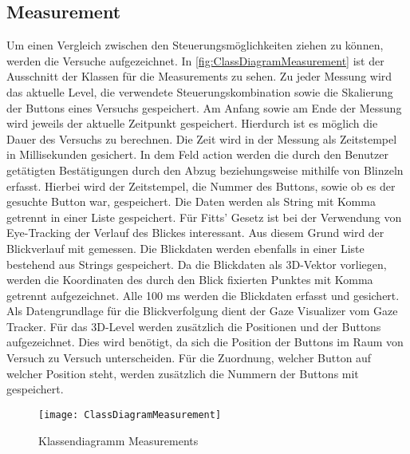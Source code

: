 \subsection{Measurement}
\label{section:measurement}
Um einen Vergleich zwischen den Steuerungsmöglichkeiten ziehen zu können, werden die Versuche aufgezeichnet. In \autoref{fig:ClassDiagramMeasurement} ist der Ausschnitt der Klassen für die Measurements zu sehen. Zu jeder Messung wird das aktuelle Level, die verwendete Steuerungskombination sowie die Skalierung der Buttons eines Versuchs gespeichert. Am Anfang sowie am Ende der Messung wird jeweils der aktuelle Zeitpunkt gespeichert. Hierdurch ist es möglich die Dauer des Versuchs zu berechnen. Die Zeit wird in der Messung als Zeitstempel in Millisekunden gesichert. In dem Feld action werden die durch den Benutzer getätigten Bestätigungen durch den Abzug beziehungsweise mithilfe von Blinzeln erfasst. Hierbei wird der Zeitstempel, die Nummer des Buttons, sowie ob es der gesuchte Button war, gespeichert.  Die Daten werden als String mit Komma getrennt in einer Liste gespeichert. Für Fitts' Gesetz ist bei der Verwendung von Eye-Tracking der Verlauf des Blickes interessant. Aus diesem Grund wird der Blickverlauf mit gemessen. Die Blickdaten werden ebenfalls in einer Liste bestehend aus Strings gespeichert. Da die Blickdaten als 3D-Vektor vorliegen, werden die Koordinaten des durch den Blick fixierten Punktes mit Komma getrennt aufgezeichnet. Alle 100 ms  werden die Blickdaten erfasst und gesichert. Als Datengrundlage für die Blickverfolgung dient der Gaze Visualizer vom Gaze Tracker. Für das 3D-Level werden zusätzlich die Positionen und der Buttons aufgezeichnet. Dies wird benötigt, da sich die Position der Buttons im Raum von Versuch zu Versuch unterscheiden. Für die Zuordnung, welcher Button auf welcher Position steht, werden zusätzlich die Nummern der Buttons mit gespeichert.

\begin{figure}[!htbp]
	\centering
	\texttt{[image: ClassDiagramMeasurement]}
	\caption[Klassendiagramm Measurements]{Klassendiagramm Measurements}
	\label{fig:ClassDiagramMeasurement}
\end{figure}

